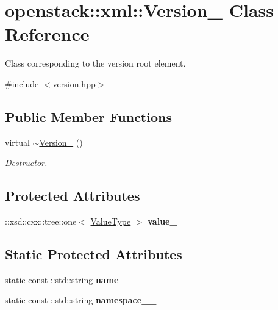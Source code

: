 \hypertarget{classopenstack_1_1xml_1_1Version__}{
\section{openstack::xml::Version\_\- Class Reference}
\label{classopenstack_1_1xml_1_1Version__}
}


Class corresponding to the version root element.  




{\ttfamily \#include $<$version.hpp$>$}

\subsection*{Public Member Functions}
\begin{DoxyCompactItemize}
\item 
\hypertarget{classopenstack_1_1xml_1_1Version___ac30d8f25fc48792bbf1fbc9fc6828c3a}{
virtual \hyperlink{classopenstack_1_1xml_1_1Version___ac30d8f25fc48792bbf1fbc9fc6828c3a}{$\sim$Version\_\-} ()}
\label{classopenstack_1_1xml_1_1Version___ac30d8f25fc48792bbf1fbc9fc6828c3a}

\begin{DoxyCompactList}\small\item\em Destructor. \item\end{DoxyCompactList}\end{DoxyCompactItemize}
\subsection*{Protected Attributes}
\begin{DoxyCompactItemize}
\item 
\hypertarget{classopenstack_1_1xml_1_1Version___a7a0c9cab1f810e5606e15c1784144986}{
::xsd::cxx::tree::one$<$ \hyperlink{classopenstack_1_1xml_1_1Version}{ValueType} $>$ {\bfseries value\_\-}}
\label{classopenstack_1_1xml_1_1Version___a7a0c9cab1f810e5606e15c1784144986}

\end{DoxyCompactItemize}
\subsection*{Static Protected Attributes}
\begin{DoxyCompactItemize}
\item 
\hypertarget{classopenstack_1_1xml_1_1Version___ab5d8969b9dcc512a5a3c1b1f43306422}{
static const ::std::string {\bfseries name\_\-}}
\label{classopenstack_1_1xml_1_1Version___ab5d8969b9dcc512a5a3c1b1f43306422}

\item 
\hypertarget{classopenstack_1_1xml_1_1Version___a1b7a4479a21ce82044fe16c9eb99c42c}{
static const ::std::string {\bfseries namespace\_\-\_\-}}
\label{classopenstack_1_1xml_1_1Version___a1b7a4479a21ce82044fe16c9eb99c42c}

\end{DoxyCompactItemize}
